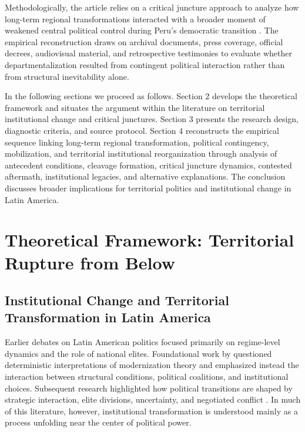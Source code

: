 \documentclass[12pt]{article}
\begin{document}
Methodologically, the article relies on a critical juncture approach to analyze how long-term regional transformations interacted with a broader moment of weakened central political control during Peru's democratic transition \parencite{capoccia_study_2007,collier_critical_2022}. The empirical reconstruction draws on archival documents, press coverage, official decrees, audiovisual material, and retrospective testimonies to evaluate whether departmentalization resulted from contingent political interaction rather than from structural inevitability alone.

In the following sections we proceed as follows. Section 2 develops the theoretical framework and situates the argument within the literature on territorial institutional change and critical junctures. Section 3 presents the research design, diagnostic criteria, and source protocol. Section 4 reconstructs the empirical sequence linking long-term regional transformation, political contingency, mobilization, and territorial institutional reorganization through analysis of antecedent conditions, cleavage formation, critical juncture dynamics, contested aftermath, institutional legacies, and alternative explanations. The conclusion discusses broader implications for territorial politics and institutional change in Latin America.

\section{Theoretical Framework: Territorial Rupture from Below}

\subsection{Institutional Change and Territorial Transformation in Latin America}

Earlier debates on Latin American politics focused primarily on regime-level dynamics and the role of national elites. Foundational work by \textcite{collier_new_1979} questioned deterministic interpretations of modernization theory and emphasized instead the interaction between structural conditions, political coalitions, and institutional choices. Subsequent research highlighted how political transitions are shaped by strategic interaction, elite divisions, uncertainty, and negotiated conflict \parencite{odonnell_transitions_1986}. In much of this literature, however, institutional transformation is understood mainly as a process unfolding near the center of political power.
\end{document}
